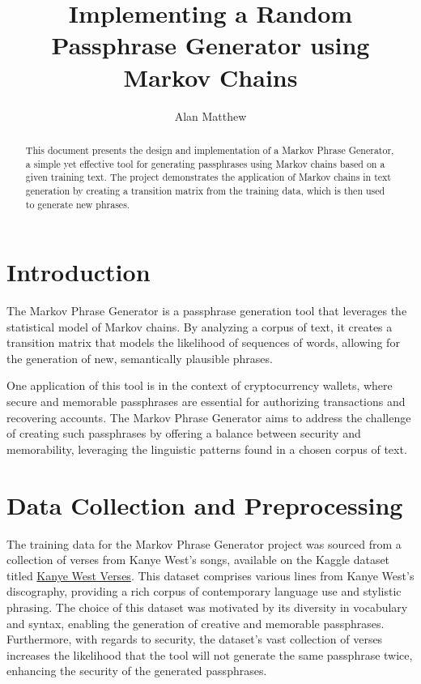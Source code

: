 \documentclass[a4paper,12pt]{article}
\begin{document}
\title{Implementing a Random Passphrase Generator using Markov Chains}
\author{Alan Matthew}
\date{}
\maketitle

\begin{abstract}
This document presents the design and implementation of a Markov Phrase Generator, a simple yet effective tool for generating passphrases using Markov chains based on a given training text. The project demonstrates the application of Markov chains in text generation by creating a transition matrix from the training data, which is then used to generate new phrases.
\end{abstract}

\pagestyle{fancy}
\fancyhead{}
\fancyfoot{}
\fancyfoot[C]{\thepage}

\newpage
\tableofcontents
\newpage

\section{Introduction}
The Markov Phrase Generator is a passphrase generation tool that leverages the statistical model of Markov chains. By analyzing a corpus of text, it creates a transition matrix that models the likelihood of sequences of words, allowing for the generation of new, semantically plausible phrases.

One application of this tool is in the context of cryptocurrency wallets, where secure and memorable passphrases are essential for authorizing transactions and recovering accounts. The Markov Phrase Generator aims to address the challenge of creating such passphrases by offering a balance between security and memorability, leveraging the linguistic patterns found in a chosen corpus of text.

\section{Data Collection and Preprocessing}
The training data for the Markov Phrase Generator project was sourced from a collection of verses from Kanye West's songs, available on the Kaggle dataset titled \href{https://www.kaggle.com/viccalexander/kanyewestverses}{Kanye West Verses}.
This dataset comprises various lines from Kanye West's discography, providing a rich corpus of contemporary language use and stylistic phrasing. The choice of this dataset was motivated by its diversity in vocabulary and syntax, enabling the generation of creative and memorable passphrases.
Furthermore, with regards to security, the dataset's vast collection of verses increases the likelihood that the tool will not generate the same passphrase twice, enhancing the security of the generated passphrases.
\end{document}
